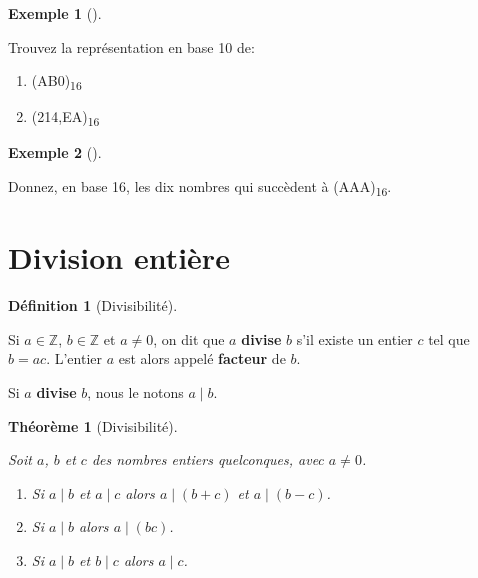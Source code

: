 \documentclass[
  letterpaper,
]{scrbook}
\providecommand{\tightlist}{%
  \setlength{\itemsep}{0pt}\setlength{\parskip}{0pt}}\usepackage{longtable,booktabs,array}
\theoremstyle{definition}
\newtheorem{example}{Exemple}[chapter]
\theoremstyle{definition}
\newtheorem{definition}{Définition}[chapter]
\theoremstyle{plain}
\newtheorem{theorem}{Théorème}[chapter]
\theoremstyle{remark}
\begin{document}
\leavevmode{}%
\begin{example}[]\label{exm-conversion-hexa-decimal}

Trouvez la représentation en base 10 de:

\begin{enumerate}
\def\labelenumi{\alph{enumi})}
\tightlist
\item
  (AB0)\textsubscript{16}
\item
  (214,EA)\textsubscript{16}
\end{enumerate}

\end{example}

\leavevmode{}%
\begin{example}[]\label{exm-nombres-succedent-hexa}

Donnez, en base 16, les dix nombres qui succèdent à
(AAA)\textsubscript{16}.

\end{example}

\hypertarget{division-entiuxe8re}{%
\section{Division entière}\label{division-entiuxe8re}}

\leavevmode{}%
\begin{definition}[Divisibilité]\label{def-divisibilite}

Si \(a\in\mathbb{Z}\), \(b\in\mathbb{Z}\) et \(a\neq 0\), on dit que
\(a\) \textbf{divise} \(b\) s'il existe un entier \(c\) tel que
\(b=ac\). L'entier \(a\) est alors appelé \textbf{facteur} de \(b\).

Si \(a\) \textbf{divise} \(b\), nous le notons \(a \mid b\).

\end{definition}

\leavevmode{}%
\begin{theorem}[Divisibilité]\label{thm-divisibilite}

Soit \(a\), \(b\) et \(c\) des nombres entiers quelconques, avec
\(a\neq 0\).

\begin{enumerate}
\def\labelenumi{\arabic{enumi}.}
\tightlist
\item
  Si \(a\mid b\) et \(a\mid c\) alors \(a\mid(b+c)\) et \(a\mid (b-c)\).
\item
  Si \(a\mid b\) alors \(a\mid (bc)\).
\item
  Si \(a\mid b\) et \(b\mid c\) alors \(a\mid c\).
\end{enumerate}

\end{theorem}
\end{document}
